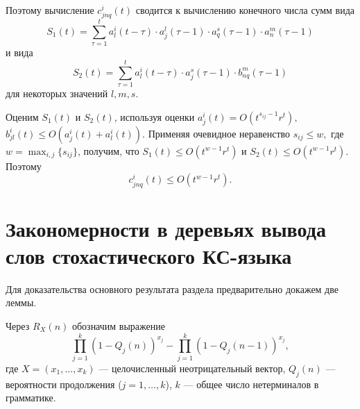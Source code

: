 \documentclass[%
11pt,a4paper]{article}
\begin{document}
{{{Поэтому вычисление $c^i_{jnq}(t)$ сводится к вычислению конечного числа
сумм вида
$$
S_1(t)= \sum_{\tau=1}^t a^i_l(t-\tau)\cdot a^l_j(\tau-1)\cdot a^s_q(\tau-1)
\cdot a^m_n(\tau-1)
$$
и вида
$$
S_2(t)= \sum_{\tau=1}^t a^i_l(t-\tau)\cdot a^s_j(\tau-1)\cdot b^m_{nq}(\tau-1)
$$
для некоторых значений $l,m,s.$

Оценим $S_1(t)$  и $S_2(t)$, используя оценки
$a^i_j(t)=O(t^{s_{ij}-1} r^t ),\,$ $b^i_{jl}(t) \le O\left(a^i_j(t)+a^i_l(t)\right).$ Применяя очевидное неравенство $s_{ij} \le w,$ где $w=\max_{i,j} \{ s_{ij} \}$, получим, что $S_1(t)\leq O(t^{w-1}r^t)$ и $S_2(t)\leq O(t^{w-1}r^t)$.
Поэтому
$$
c^i_{jnq}(t)\leq O\left(t^{w-1}r^t \right).
$$




\medskip

\section{Закономерности в деревьях вывода слов стохастического КС-языка
}

\vspace*{3mm}

\medskip

Для доказательства основного результата раздела предварительно докажем две леммы.

Через $R_X(n)$ обозначим выражение
\begin{equation}
\prod_{j=1}^k \left(1-Q_j(n)\right)^{x_j}-
\prod_{j=1}^k \left(1-Q_j(n-1)\right)^{x_j},
\label{z1}
\end{equation}
где $X=(x_1, \ldots, x_k)$ --- целочисленный неотрицательный вектор, $Q_j(n)$ --- вероятности продолжения ($j=1,\ldots,k$), $k$ --- общее число нетерминалов в грамматике.


}}}
\end{document}
